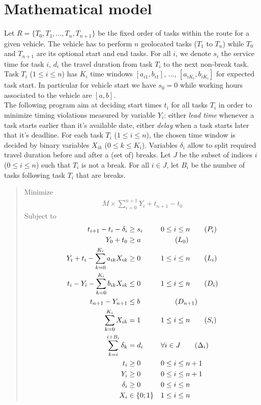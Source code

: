 \documentclass{article}
\begin{document}
\section{Mathematical model}

Let $R=\{T_0, T_1, \ldots, T_n, T_{n + 1}\}$ be the fixed order of
tasks within the route for a given vehicle. The vehicle has to perform
$n$ geolocated tasks ($T_1$ to $T_n$) while $T_0$ and $T_{n + 1}$ are
its optional start and end tasks. For all $i$, we denote $s_i$ the
service time for task $i$, $d_i$ the travel duration from task $T_i$
to the next non-break task. Task $T_i$ ($1\leq i \leq n$) has $K_i$
time windows $[a_{i1}, b_{i1}]$, $\dots$, $[a_{iK_i}, b_{iK_i}]$ for
expected task start. In particular for vehicle start we have $s_0 = 0$
while working hours associated to the vehicle are $[a, b]$.\\

The following program aim at deciding start times $t_i$ for all tasks
$T_i$ in order to minimize timing violations measured by variable
$Y_i$: either \textit{lead time} whenever a task starts earlier than
it's available date, either \textit{delay} when a task starts later
that it's deadline. For each task $T_i$ ($1\leq i\leq n$), the chosen
time window is decided by binary variables $X_{ik}$
($0\leq k \leq K_i$). Variables $\delta_i$ allow to split required
travel duration before and after a (set of) breaks. Let $J$ be the
subset of indices $i$ ($0\leq i \leq n$) such that $T_i$ is not a
break. For all $i\in J$, let $B_i$ be the number of tasks following
task $T_i$ that are breaks.

\begin{quote}
  Minimize
  \begin{align}
    M \times \sum_{i = 0}^{n + 1} Y_i + t_{n +1} - t_0 \label{obj}\tag{Obj}
  \end{align}
  Subject to
  \begin{align}
    t_{i + 1} - t_i - \delta_i &\geq s_i && 0 \leq i \leq n\label{precedence}\tag{$P_i$}\\
    Y_0 + t_0 &\geq a &&  \label{lead_start}\tag{$L_0$}\\
    Y_i + t_i - \sum_{k = 0}^{K_i}a_{ik}X_{ik}&\geq 0 && 1 \leq i \leq n \label{lead}\tag{$L_i$}\\
    t_i - Y_i - \sum_{k = 0}^{K_i}b_{ik}X_{ik} &\leq 0 && 1 \leq i \leq n \label{delay}\tag{$D_i$}\\
    t_{n + 1} - Y_{n + 1} &\leq b && \label{delay_end}\tag{$D_{n + 1}$}\\
    \sum_{k = 0}^{K_i}X_{ik} &= 1 && 1 \leq i \leq n \label{tw_sum}\tag{$S_i$}\\
    \sum_{k = i}^{i + B_i}\delta_k &= d_i && \forall i\in J \label{break_duration}\tag{$\Delta_i$}\\
    t_i &\geq 0 && 0 \leq i \leq n + 1 \nonumber\\
    Y_i &\geq 0 && 0 \leq i \leq n + 1 \nonumber\\
    \delta_i &\geq 0 && 0 \leq i \leq n \nonumber\\
    X_i &\in \{0; 1\} && 1 \leq i \leq n \nonumber
  \end{align}
\end{quote}
\end{document}
